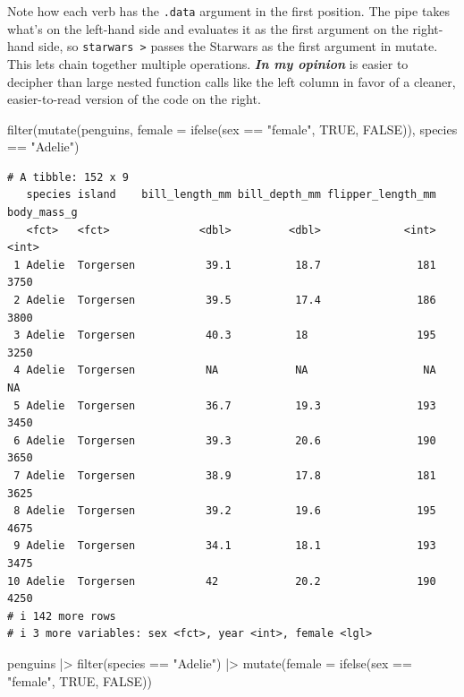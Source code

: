 \documentclass[
  letterpaper,
  DIV=11,
  numbers=noendperiod,
  oneside]{scrreprt}
\newenvironment{Shaded}{\begin{snugshade}}{\end{snugshade}}
\newcommand{\AttributeTok}[1]{\textcolor[rgb]{0.40,0.45,0.13}{#1}}
\newcommand{\ConstantTok}[1]{\textcolor[rgb]{0.56,0.35,0.01}{#1}}
\newcommand{\FunctionTok}[1]{\textcolor[rgb]{0.28,0.35,0.67}{#1}}
\newcommand{\NormalTok}[1]{\textcolor[rgb]{0.00,0.23,0.31}{#1}}
\newcommand{\SpecialCharTok}[1]{\textcolor[rgb]{0.37,0.37,0.37}{#1}}
\newcommand{\StringTok}[1]{\textcolor[rgb]{0.13,0.47,0.30}{#1}}
\begin{document}
Note how each verb has the \texttt{.data} argument in the first
position. The pipe takes what's on the left-hand side and evaluates it
as the first argument on the right-hand side, so
\texttt{starwars\ \textbar{}\textgreater{}} passes the Starwars as the
first argument in mutate. This lets chain together multiple operations.
\textbf{\emph{In my opinion}} is easier to decipher than large nested
function calls like the left column in favor of a cleaner,
easier-to-read version of the code on the right.

\begin{Shaded}
\begin{Highlighting}[]
 \FunctionTok{filter}\NormalTok{(}\FunctionTok{mutate}\NormalTok{(penguins,}
  \AttributeTok{female =} \FunctionTok{ifelse}\NormalTok{(sex }\SpecialCharTok{==} \StringTok{"female"}\NormalTok{,}
    \ConstantTok{TRUE}\NormalTok{, }\ConstantTok{FALSE}\NormalTok{)),}
\NormalTok{     species }\SpecialCharTok{==} \StringTok{"Adelie"}\NormalTok{)}
\end{Highlighting}
\end{Shaded}

\begin{verbatim}
# A tibble: 152 x 9
   species island    bill_length_mm bill_depth_mm flipper_length_mm body_mass_g
   <fct>   <fct>              <dbl>         <dbl>             <int>       <int>
 1 Adelie  Torgersen           39.1          18.7               181        3750
 2 Adelie  Torgersen           39.5          17.4               186        3800
 3 Adelie  Torgersen           40.3          18                 195        3250
 4 Adelie  Torgersen           NA            NA                  NA          NA
 5 Adelie  Torgersen           36.7          19.3               193        3450
 6 Adelie  Torgersen           39.3          20.6               190        3650
 7 Adelie  Torgersen           38.9          17.8               181        3625
 8 Adelie  Torgersen           39.2          19.6               195        4675
 9 Adelie  Torgersen           34.1          18.1               193        3475
10 Adelie  Torgersen           42            20.2               190        4250
# i 142 more rows
# i 3 more variables: sex <fct>, year <int>, female <lgl>
\end{verbatim}

\begin{Shaded}
\begin{Highlighting}[]
\NormalTok{penguins }\SpecialCharTok{|\textgreater{}}
\FunctionTok{filter}\NormalTok{(species }\SpecialCharTok{==} \StringTok{"Adelie"}\NormalTok{) }\SpecialCharTok{|\textgreater{}}
\FunctionTok{mutate}\NormalTok{(}\AttributeTok{female =} \FunctionTok{ifelse}\NormalTok{(sex }\SpecialCharTok{==} \StringTok{"female"}\NormalTok{, }\ConstantTok{TRUE}\NormalTok{, }\ConstantTok{FALSE}\NormalTok{))}
\end{Highlighting}
\end{Shaded}
\end{document}
